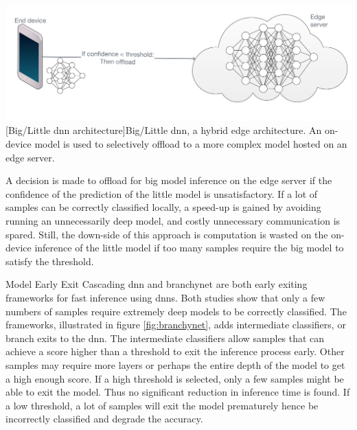 \begin{enumdescript}
	\begin{minipage}[t]{\linewidth}    
		\centering                          
		\includegraphics[width=.8\linewidth]{figures/models/big_little_dnn}
		[Big/Little \gls{dnn} architecture]{Big/Little \gls{dnn}, a hybrid edge architecture. An on-device model is used to selectively offload to a more complex model hosted on an edge server.}
		\label{fig:big/little-dnn}
	\end{minipage}
	
	A decision is made to offload for big model inference on the edge server if the confidence of the prediction of the little model is unsatisfactory. If a lot of samples can be correctly classified locally, a speed-up is gained by avoiding running an unnecessarily deep model, and costly unnecessary communication is spared. Still, the down-side of this approach is computation is wasted on the on-device inference of the little model if too many samples require the big model to satisfy the threshold. 
	
	\item[Model Early Exit] Cascading \gls{dnn} \cite{leroux_resource-constrained_2015} and \gls{branchynet} \cite{teerapittayanon_branchynet:_2016} are both early exiting frameworks for fast inference using \gls{dnn}s. Both studies show that only a few numbers of samples require extremely deep models to be correctly classified. The frameworks, illustrated in figure \ref{fig:branchynet}, adds intermediate classifiers, or branch exits to the \gls{dnn}. The intermediate classifiers allow samples that can achieve a score higher than a threshold to exit the inference process early. Other samples may require more layers or perhaps the entire depth of the model to get a high enough score. If a high threshold is selected, only a few samples might be able to exit the model. Thus no significant reduction in inference time is found. If a low threshold, a lot of samples will exit the model prematurely hence be incorrectly classified and degrade the accuracy. 
	

\end{enumdescript}
